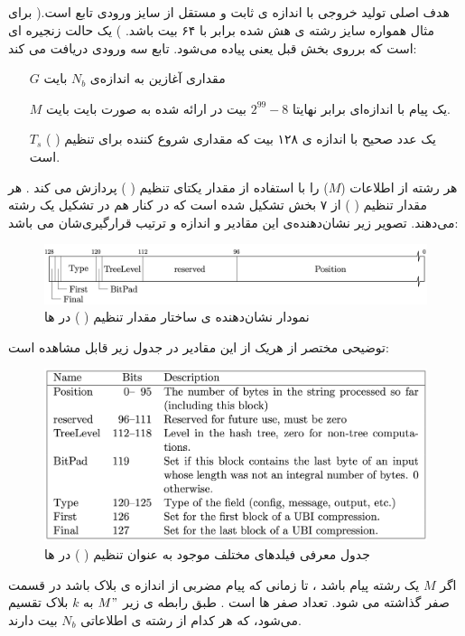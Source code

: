 \subsection{
}
هدف اصلی    تولید خروجی با اندازه ی ثابت و مستقل از سایز ورودی تابع 
 است.( برای مثال همواره سایز رشته ی هش شده برابر با ۶۴ بیت باشد. )
یک حالت زنجیره ای است که بر‌روی بخش قبل یعنی 
پیاده می‌شود. تابع  سه ورودی دریافت می کند:
\begin{itemize}
	\item [$G$]
	مقداری آغازین به اندازه‌ی 
	$N_b$ 
	بایت 
	\item [$M$]
	یک پیام با اندازه‌ای برابر نهایتا $2^{99} - 8$ بیت در ارائه شده به صورت بایت بایت.
	
	
	\item [$T_s$]
یک عدد صحیح با اندازه ی ۱۲۸ بیت که مقداری شروع کننده برای تنظیم (
)
است.
\end{itemize}

 هر رشته از اطلاعات 
 ($M$)
 را با استفاده از مقدار یکتای تنظیم ( ) پردازش می کند .
هر مقدار تنظیم ( ) از ۷ بخش تشکیل شده است که در کنار هم در تشکیل یک رشته می‌دهند. تصویر زیر نشان‌دهنده‌ی این مقادیر و اندازه و ترتیب قرارگیری‌شان می باشد:

\begin{figure}[H]
	\centering
	\includegraphics[width=14cm]{Images/Introduction/ubi_tweak_format.png}	
	\caption{
		نمودار نشان‌دهنده ی ساختار مقدار تنظیم ( ) در  ها
	}
\end{figure}
توضیحی مختصر از هر‌یک از این مقادیر در جدول زیر قابل مشاهده است:

\begin{figure}[H]
	\centering
	\includegraphics[width=15cm]{Images/Introduction/ubi_tweak_fields_table.png}	
	\caption{
		جدول معرفی فیلد‌های مختلف موجود به عنوان تنظیم ( ) در  ها
	}
	
	
\end{figure}
اگر 
$M$
یک رشته پیام باشد ، تا زمانی که پیام مضربی از اندازه ی بلاک باشد در قسمت  صفر گذاشته می شود.  تعداد صفر ها است . طبق رابطه ی زیر
$M"$ 
به $k$ بلاک تقسیم می‌شود، که هر کدام از رشته ی اطلاعاتی $N_b$ بیت دارند. 

